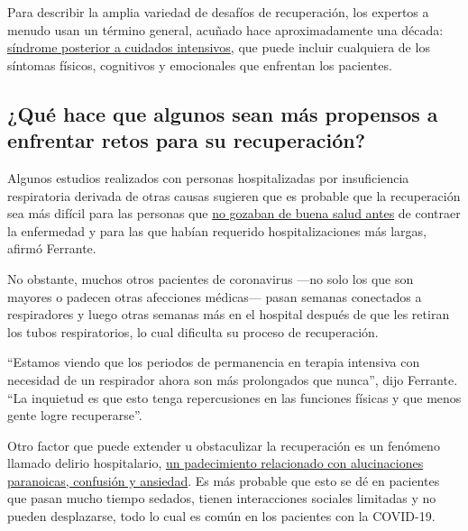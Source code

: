 Para describir la amplia variedad de desafíos de recuperación, los
expertos a menudo usan un término general, acuñado hace aproximadamente
una década:
\href{https://www.sccm.org/MyICUCare/THRIVE/Post-intensive-Care-Syndrome\#:~:text=Post\%2Dintensive\%20care\%20syndrome\%2C\%20or\%20PICS\%2C\%20is\%20made\%20up,and\%20may\%20affect\%20the\%20family.}{síndrome
posterior a cuidados intensivos}, que puede incluir cualquiera de los
síntomas físicos, cognitivos y emocionales que enfrentan los pacientes.

\hypertarget{quuxe9-hace-que-algunos-sean-muxe1s-propensos-a-enfrentar-retos-para-su-recuperaciuxf3n}{%
\subsection{¿Qué hace que algunos sean más propensos a enfrentar retos
para su
recuperación?}\label{quuxe9-hace-que-algunos-sean-muxe1s-propensos-a-enfrentar-retos-para-su-recuperaciuxf3n}}

Algunos estudios realizados con personas hospitalizadas por
insuficiencia respiratoria derivada de otras causas sugieren que es
probable que la recuperación sea más difícil para las personas que
\href{https://www.ncbi.nlm.nih.gov/pmc/articles/PMC6026287/}{no gozaban
de buena salud antes} de contraer la enfermedad y para las que habían
requerido hospitalizaciones más largas, afirmó Ferrante.

No obstante, muchos otros pacientes de coronavirus ---no solo los que
son mayores o padecen otras afecciones médicas--- pasan semanas
conectados a respiradores y luego otras semanas más en el hospital
después de que les retiran los tubos respiratorios, lo cual dificulta su
proceso de recuperación.

``Estamos viendo que los periodos de permanencia en terapia intensiva
con necesidad de un respirador ahora son más prolongados que nunca'',
dijo Ferrante. ``La inquietud es que esto tenga repercusiones en las
funciones físicas y que menos gente logre recuperarse''.

Otro factor que puede extender u obstaculizar la recuperación es un
fenómeno llamado delirio hospitalario,
\href{https://www.nytimes3xbfgragh.onion/es/2020/07/01/espanol/ciencia-y-tecnologia/coronavirus-delirio-alucinaciones.html}{un
padecimiento relacionado con alucinaciones paranoicas, confusión y
ansiedad}. Es más probable que esto se dé en pacientes que pasan mucho
tiempo sedados, tienen interacciones sociales limitadas y no pueden
desplazarse, todo lo cual es común en los pacientes con la COVID-19.


